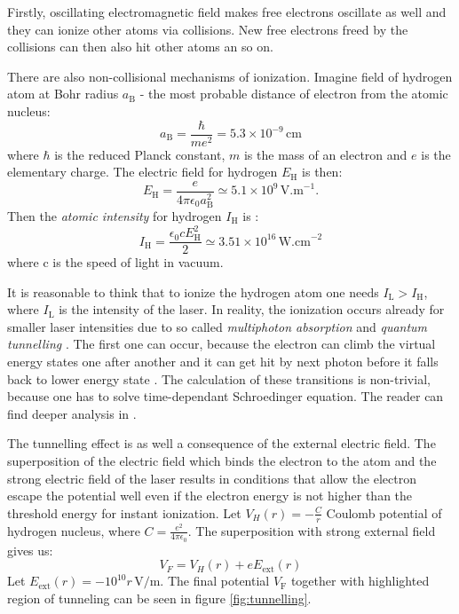 Firstly, oscillating electromagnetic field makes free electrons oscillate as well and they can ionize other atoms via collisions. New free electrons freed by the collisions can then also hit other atoms an so on.

There are also non-collisional mechanisms of ionization. Imagine field of hydrogen atom at Bohr radius $a_\mathrm{B}$ - the most probable distance of electron from the atomic nucleus:
\begin{equation}
	a_\mathrm{B} = \frac{\hbar}{me^2} = 5.3 \times 10^{-9} \, \mathrm{ cm}
\end{equation}
\noindent where $\hbar$ is the reduced Planck constant, $m$ is the mass of an electron and $e$ is the elementary charge.
The electric field for hydrogen $E_{\mathrm{H}}$ is then:
\begin{equation}
	E_{\mathrm{H}} = \frac{e}{4\pi\epsilon_0 a_\mathrm{B}^2} \simeq 5.1 \times 10^{9} \, \mathrm{V.m}^{-1}.
\end{equation}
\noindent Then the \textit{atomic intensity} for hydrogen $I_{\mathrm{H}}$ is \cite{plasma-intro}:
\begin{equation}
	I_{\mathrm{H}} = \frac{\epsilon_0 c E_{\mathrm{H}}^2}{2} \simeq 3.51 \times 10^{16} \, \mathrm{W.cm}^{-2}
\end{equation}
\noindent where $\mathrm{c}$ is the speed of light in vacuum.

It is reasonable to think that to ionize the hydrogen atom one needs $I_\mathrm{L}>I_{\mathrm{H}}$, where $I_{\mathrm{L}}$ is the intensity of the laser. In reality, the ionization occurs already for smaller laser intensities due to so called \textit{multiphoton absorption} \cite{plasma-intro} and \textit{quantum tunnelling} \cite{laser-plasma1}. The first one can occur, because the electron can climb the virtual energy states one after another and it can get hit by next photon before it falls back to lower energy state \cite{laser-plasma1}. The calculation of these transitions is non-trivial, because one has to solve time-dependant Schroedinger equation. The reader can find deeper analysis in \cite{atoms-in-lasers}.

The tunnelling effect is as well a consequence of the external electric field. The superposition of the electric field which binds the electron to the atom and the strong electric field of the laser results in conditions that allow the electron escape the potential well even if the electron energy is not higher than the threshold energy for instant ionization. Let $V_H(r)= -\frac{C}{r}$ Coulomb potential of hydrogen nucleus, where $C = \frac{e^2}{4\pi\epsilon_0}$. The superposition with strong external field gives us:
\begin{equation}
	V_F = V_H(r) + eE_{\mathrm{ext}}(r)
\end{equation}
Let $E_{\mathrm{ext}}(r) = -10^{10}r\,\mathrm{V/m}$. The final potential $V_\mathrm{F}$ together with highlighted region of tunneling can be seen in figure \ref{fig:tunnelling}. 

